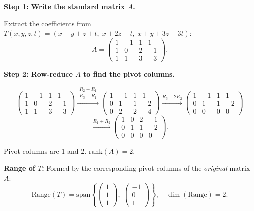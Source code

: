 \documentclass[12pt,a3paper]{article}
\begin{document}
\begin{tcolorbox}[enhanced,breakable,
  colback=cF!4,colframe=cF,boxrule=0.8pt,arc=5pt,
  title={\textbf{Answer --- $T:\mathbb{R}^4\to\mathbb{R}^3$ (MATH 247): $\ker T$ and $\mathrm{Range}(T)$}},
  fonttitle=\bfseries\color{white},colbacktitle=cF]

\textbf{Step 1: Write the standard matrix $A$.}

Extract the coefficients from $T(x,y,z,t) = (x-y+z+t,\; x+2z-t,\; x+y+3z-3t)$:
\[
A=\begin{pmatrix}1&-1&1&1\\1&0&2&-1\\1&1&3&-3\end{pmatrix}.
\]

\textbf{Step 2: Row-reduce $A$ to find the pivot columns.}

\[
\begin{pmatrix}1&-1&1&1\\1&0&2&-1\\1&1&3&-3\end{pmatrix}
\xrightarrow{\substack{R_2-R_1\\[1pt] R_3-R_1}}
\begin{pmatrix}1&-1&1&1\\0&1&1&-2\\0&2&2&-4\end{pmatrix}
\xrightarrow{R_3-2R_2}
\begin{pmatrix}1&-1&1&1\\0&1&1&-2\\0&0&0&0\end{pmatrix}
\]
\[
\xrightarrow{R_1+R_2}
\begin{pmatrix}1&0&2&-1\\0&1&1&-2\\0&0&0&0\end{pmatrix}.
\]

Pivot columns are 1 and 2. $\mathrm{rank}(A)=2$.

\medskip\textbf{Range of $T$:}
Formed by the corresponding pivot columns of the \emph{original} matrix $A$:
\[
\boxed{\mathrm{Range}(T)=\mathrm{span}\!\left\{\begin{pmatrix}1\\1\\1\end{pmatrix},\;\begin{pmatrix}-1\\0\\1\end{pmatrix}\right\},\quad\dim(\mathrm{Range})=2.}
\]


\end{tcolorbox}
\end{document}

